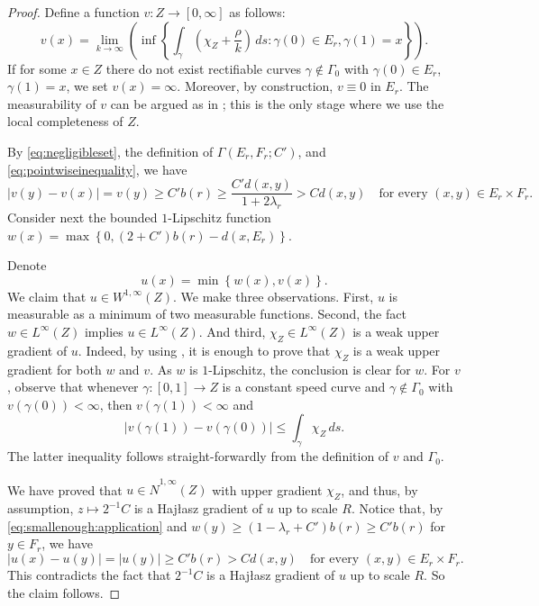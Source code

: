 \documentclass[reqno]{amsart}
\numberwithin{equation}{section}
\theoremstyle{remark}
\def\dfrac{\displaystyle\frac}
\begin{document}
\begin{proof}
Define a function $v \colon Z \rightarrow \left[0, \infty\right]$ as follows:
\begin{equation*}
    v(x)
    =
    \lim_{ k \rightarrow \infty }\left(
    \inf\left\{
        \int_{ \gamma } \left( \chi_Z + \frac{\rho}{k} \right) \,ds
        \colon
        \gamma(0) \in E_r, \gamma(1) = x
    \right\}\right).
\end{equation*}
If for some  $x\in Z$ there do not exist rectifiable curves $\gamma \not\in \Gamma_{0}$ with $\gamma(0) \in E_r
$, $\gamma(1) = x$, we set $v(x)=\infty$. Moreover, by construction, $v \equiv 0$ in $E_r$. The measurability of $v$ can be argued as in \cite[Corollary 1.10]{Ja:Ja:Ro:Ro:Sha:07}; this is the only stage where we use the local completeness of $Z$.

By \eqref{eq:negligibleset}, the definition of $\Gamma(E_r,F_r;C')$, and \eqref{eq:pointwiseinequality}, we have
\begin{equation}\label{eq:smallenough:application}
    | v(y) - v(x) |
    =
    v(y)
    \geq
    C' b(r)
    \geq
    \dfrac{C' d(x,y)}{1+2\lambda_r}
    >
    C d(x,y)
    \quad\text{for every $(x,y) \in E_r \times F_r$}.
\end{equation}
Consider next the bounded $1$-Lipschitz function $w(x) = \max\left\{ 0, ( 2 + C' ) b(r) - d(x,E_r) \right\}$.

Denote $$u(x) = \min\left\{ w(x), v(x) \right\}.$$ We claim that $u\in W^{1,\infty}(Z)$. We make three observations. First, $u$ is measurable as a minimum of two measurable functions. Second, the fact $w\in L^{\infty}(Z)$ implies $u\in L^{\infty}(Z)$. And third, $\chi_{Z}\in L^{\infty}(Z)$ is a weak upper gradient of $u$. Indeed, by using \cite[Proposition 6.3.23]{HKST2015}, it is enough to prove that $\chi_{Z}$ is a weak upper gradient for both $w$ and $v$. As $w$ is $1$-Lipschitz, the conclusion is clear for $w$. For $v$, observe that whenever $\gamma \colon \left[0,1\right] \rightarrow Z$ is a constant speed curve and $\gamma \not\in \Gamma_0$ with $v( \gamma(0) ) < \infty$, then $v( \gamma(1) ) < \infty$ and
\begin{equation*}
    | v( \gamma(1) ) - v( \gamma(0) ) | \leq \int_{ \gamma } \chi_{Z} \,ds.
\end{equation*}
The latter inequality follows straight-forwardly from the definition of $v$ and $\Gamma_0$.

We have proved that $u\in \widehat{N}^{1,\infty}(Z)$ with upper gradient $\chi_{Z}$, and thus, by assumption, $z \mapsto 2^{-1}C$ is a Haj\l{}asz gradient of $u$ up to scale $R$. Notice that, by \eqref{eq:smallenough:application} and $w(y) \geq (1-\lambda_r+C')b(r) \geq C' b(r)$ for $y\in  F_r$, we have
\begin{equation*}
    | u(x) - u(y) |
    =
    | u(y) |
    \geq 
    C' b(r)
    >
    C d(x,y)
    \quad\text{for every $(x,y) \in E_r \times F_r$.}
\end{equation*}
This contradicts the fact that $2^{-1}C$ is a Haj\l{}asz gradient of $u$ up to scale $R$. So the claim follows.
\end{proof}
\end{document}

